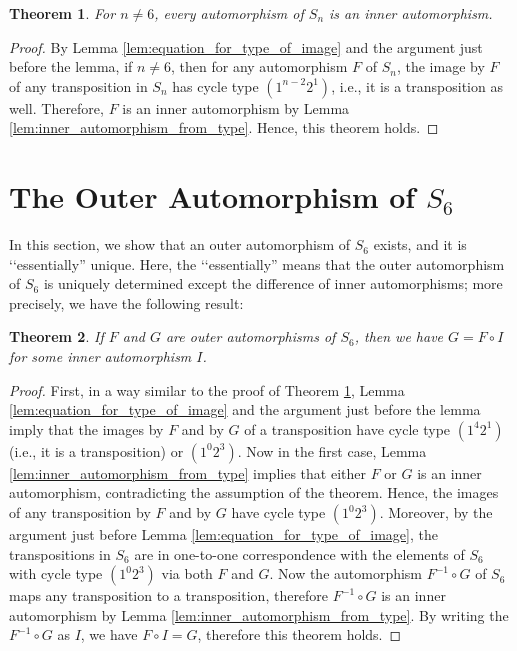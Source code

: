 \documentclass[11pt]{article}
\newtheorem{theorem}{Theorem}
\begin{document}
\begin{theorem}
\label{thm:no_outer_auto_for_n_not_6}
For $n \neq 6$, every automorphism of $S_n$ is an inner automorphism.
\end{theorem}
\begin{proof}
By Lemma \ref{lem:equation_for_type_of_image} and the argument just before the lemma, if $n \neq 6$, then for any automorphism $F$ of $S_n$, the image by $F$ of any transposition in $S_n$ has cycle type $(1^{n-2}2^1)$, i.e., it is a transposition as well.
Therefore, $F$ is an inner automorphism by Lemma \ref{lem:inner_automorphism_from_type}.
Hence, this theorem holds.
\end{proof}

\section{The Outer Automorphism of $S_6$}
\label{sec:out_S6}

In this section, we show that an outer automorphism of $S_6$ exists, and it is \lq\lq essentially'' unique.
Here, the \lq\lq essentially'' means that the outer automorphism of $S_6$ is uniquely determined except the difference of inner automorphisms; more precisely, we have the following result:

\begin{theorem}
\label{thm:unique_outer_auto_for_S6}
If $F$ and $G$ are outer automorphisms of $S_6$, then we have $G = F \circ I$ for some inner automorphism $I$.
\end{theorem}
\begin{proof}
First, in a way similar to the proof of Theorem \ref{thm:no_outer_auto_for_n_not_6}, Lemma \ref{lem:equation_for_type_of_image} and the argument just before the lemma imply that the images by $F$ and by $G$ of a transposition have cycle type $(1^4 2^1)$ (i.e., it is a transposition) or $(1^0 2^3)$.
Now in the first case, Lemma \ref{lem:inner_automorphism_from_type} implies that either $F$ or $G$ is an inner automorphism, contradicting the assumption of the theorem.
Hence, the images of any transposition by $F$ and by $G$ have cycle type $(1^0 2^3)$.
Moreover, by the argument just before Lemma \ref{lem:equation_for_type_of_image}, the transpositions in $S_6$ are in one-to-one correspondence with the elements of $S_6$ with cycle type $(1^0 2^3)$ via both $F$ and $G$.
Now the automorphism $F^{-1} \circ G$ of $S_6$ maps any transposition to a transposition, therefore $F^{-1} \circ G$ is an inner automorphism by Lemma \ref{lem:inner_automorphism_from_type}.
By writing the $F^{-1} \circ G$ as $I$, we have $F \circ I = G$, therefore this theorem holds.
\end{proof}
\end{document}
